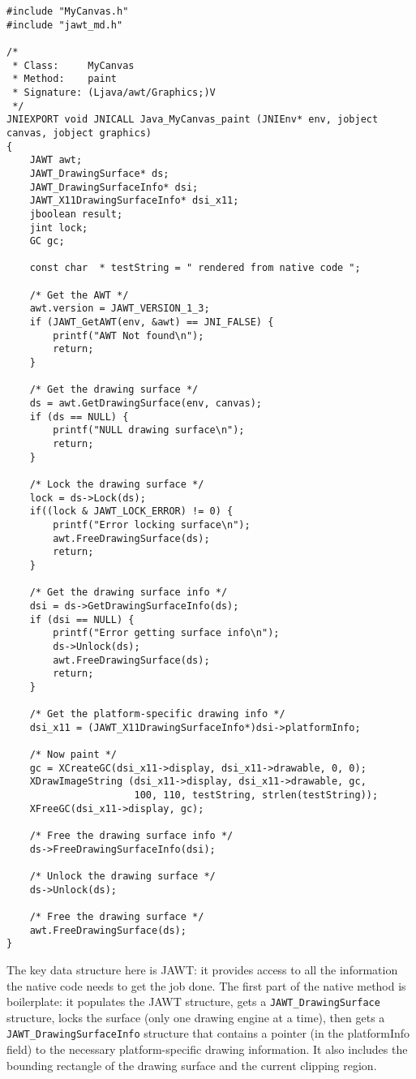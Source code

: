 \documentclass[a4paper]{article}
\newcommand{\code}[1]			{\texttt{#1}}
\begin{document}
{\small \begin{verbatim}
#include "MyCanvas.h"
#include "jawt_md.h"

/*
 * Class:     MyCanvas
 * Method:    paint
 * Signature: (Ljava/awt/Graphics;)V
 */
JNIEXPORT void JNICALL Java_MyCanvas_paint (JNIEnv* env, jobject canvas, jobject graphics)
{
    JAWT awt;
    JAWT_DrawingSurface* ds;
    JAWT_DrawingSurfaceInfo* dsi;
    JAWT_X11DrawingSurfaceInfo* dsi_x11;
    jboolean result;
    jint lock;
    GC gc;
    
    const char	* testString = " rendered from native code ";

    /* Get the AWT */
    awt.version = JAWT_VERSION_1_3;
    if (JAWT_GetAWT(env, &awt) == JNI_FALSE) {
        printf("AWT Not found\n");
        return;
    }

    /* Get the drawing surface */
    ds = awt.GetDrawingSurface(env, canvas);
    if (ds == NULL) {
        printf("NULL drawing surface\n");
        return;
    }

    /* Lock the drawing surface */
    lock = ds->Lock(ds);
    if((lock & JAWT_LOCK_ERROR) != 0) {
        printf("Error locking surface\n");
        awt.FreeDrawingSurface(ds);
        return;
    }

    /* Get the drawing surface info */
    dsi = ds->GetDrawingSurfaceInfo(ds);
    if (dsi == NULL) {
        printf("Error getting surface info\n");
        ds->Unlock(ds);
        awt.FreeDrawingSurface(ds);
        return;
    }

    /* Get the platform-specific drawing info */
    dsi_x11 = (JAWT_X11DrawingSurfaceInfo*)dsi->platformInfo;

    /* Now paint */
    gc = XCreateGC(dsi_x11->display, dsi_x11->drawable, 0, 0);
    XDrawImageString (dsi_x11->display, dsi_x11->drawable, gc,
                      100, 110, testString, strlen(testString));
    XFreeGC(dsi_x11->display, gc);

    /* Free the drawing surface info */
    ds->FreeDrawingSurfaceInfo(dsi);

    /* Unlock the drawing surface */
    ds->Unlock(ds);

    /* Free the drawing surface */
    awt.FreeDrawingSurface(ds);
}
\end{verbatim}
}
The key data structure here is JAWT: it provides access to all the information the native code needs to get the job done. The first part of the native method is boilerplate: it populates the JAWT structure, gets a \code{JAWT\_DrawingSurface} structure, locks the surface (only one drawing engine at a time), then gets a \code{JAWT\_DrawingSurfaceInfo} structure that contains a pointer (in the platformInfo field) to the necessary platform-specific drawing information. It also includes the bounding rectangle of the drawing surface and the current clipping region.
\end{document}
